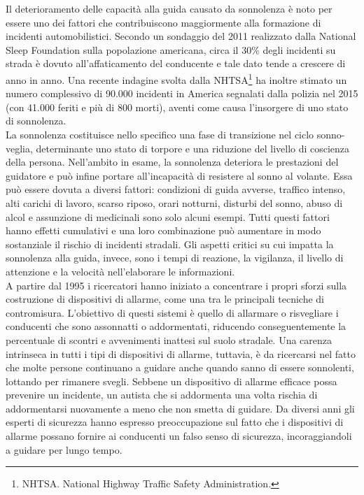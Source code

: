 \documentclass[12pt]{article}
\begin{document}
Il deterioramento delle capacità alla guida causato da sonnolenza è noto per essere uno dei fattori che contribuiscono maggiormente alla formazione di incidenti automobilistici. Secondo un sondaggio del 2011 realizzato dalla National Sleep Foundation sulla popolazione americana, circa il 30\% degli incidenti su strada è dovuto all'affaticamento del conducente e tale dato tende a crescere di anno in anno\cite{SleepInAmerica}. Una recente indagine svolta dalla NHTSA\footnote{NHTSA. National Highway Traffic Safety Administration.} ha inoltre stimato un numero complessivo di 90.000 incidenti in America segnalati dalla polizia nel 2015 (con 41.000 feriti e più di 800 morti), aventi come causa l'insorgere di uno stato di sonnolenza\cite{NHTSA}.\\
La sonnolenza costituisce nello specifico una fase di transizione nel ciclo sonno-veglia, determinante uno stato di torpore e una riduzione del livello di coscienza della persona. Nell'ambito in esame, la sonnolenza deteriora le prestazioni del guidatore e può infine portare all'incapacità di resistere al sonno al volante. Essa può essere dovuta a diversi fattori: condizioni di guida avverse, traffico intenso, alti carichi di lavoro, scarso riposo, orari notturni, disturbi del sonno, abuso di alcol e assunzione di medicinali sono solo alcuni esempi. Tutti questi fattori hanno effetti cumulativi e una loro combinazione può aumentare in modo sostanziale il rischio di incidenti stradali. Gli aspetti critici su cui impatta la sonnolenza alla guida, invece, sono i tempi di reazione, la vigilanza, il livello di attenzione e la velocità nell'elaborare le informazioni.\\
A partire dal 1995 i ricercatori hanno iniziato a concentrare i propri sforzi sulla costruzione di dispositivi di allarme, come una tra le principali tecniche di contromisura. L'obiettivo di questi sistemi è quello di allarmare o risvegliare i conducenti che sono assonnatti o addormentati, riducendo conseguentemente la percentuale di scontri e avvenimenti inattesi sul suolo stradale. Una carenza intrinseca in tutti i tipi di dispositivi di allarme, tuttavia, è da ricercarsi nel fatto che molte persone continuano a guidare anche quando sanno di essere sonnolenti, lottando per rimanere svegli. Sebbene un dispositivo di allarme efficace possa prevenire un incidente, un autista che si addormenta una volta rischia di addormentarsi nuovamente a meno che non smetta di guidare. Da diversi anni gli esperti di sicurezza hanno espresso preoccupazione sul fatto che i dispositivi di allarme possano fornire ai conducenti un falso senso di sicurezza, incoraggiandoli a guidare per lungo tempo\cite{DrowsyDrivingReport}.\\
\end{document}
